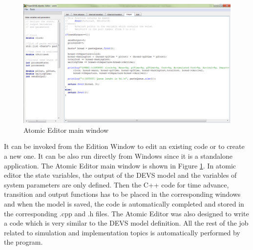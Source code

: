 \documentclass[titlepage]{report}%
\begin{document}
\begin{figure}[ht!]
  \centering
    \includegraphics[width=1\textwidth]{Fig6.png}
    \caption{Atomic Editor main window}
    \label{atomic_win}
\end{figure}

It can be invoked from the Edition Window to edit an existing code or to create a new one. It can be also run directly from Windows since it is a standalone application. The Atomic Editor main window is shown in Figure \ref{atomic_win}. In atomic editor the state variables, the output of the DEVS model and the variables of system parameters are only defined. Then the C++ code for time advance, transition and output functions has to be placed in the corresponding windows and when the model is saved, the code is automatically completed and stored in the corresponding .cpp and .h files. The Atomic Editor was also designed to write a code which is very similar to the DEVS model definition. All the rest of the job related to simulation and implementation topics is automatically performed by the program.
\end{document}
